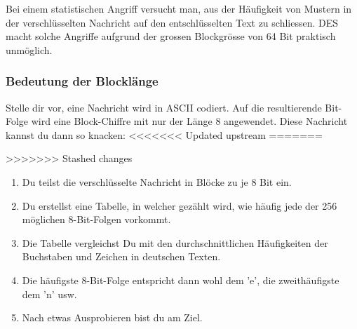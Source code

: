 \documentclass[%
<<<<<<< Updated upstream
11pt,%
twoside,%
titlepage,%
german,%
headsepline%
]{scrartcl}
\begin{document}
\begin{cdef}[Linksverschiebung]{}
\begin{cdef}{}
Bei einem statistischen Angriff versucht man, aus der Häufigkeit von Mustern in der verschlüsselten Nachricht auf den entschlüsselten Text zu schliessen. 
DES macht solche Angriffe aufgrund der grossen Blockgrösse von 64 Bit praktisch unmöglich.

\subsubsection{Bedeutung der Blocklänge}

Stelle dir vor, eine Nachricht wird in ASCII codiert. Auf die resultierende Bit-Folge wird eine Block-Chiffre mit nur der Länge 8 angewendet. 
Diese Nachricht kannst du dann so knacken:
<<<<<<< Updated upstream
=======

>>>>>>> Stashed changes
\begin{enumerate}
\item Du teilst die verschlüsselte Nachricht in Blöcke zu je 8 Bit ein.
\item Du erstellst eine Tabelle, in welcher gezählt wird, wie häufig jede der 256 möglichen 8-Bit-Folgen vorkommt.
\item Die Tabelle vergleichst Du mit den durchschnittlichen Häufigkeiten der Buchstaben und Zeichen in deutschen Texten.
\item Die häufigste 8-Bit-Folge entspricht dann wohl dem 'e', die zweithäufigste dem 'n' usw.
\item Nach etwas Ausprobieren bist du am Ziel.
\end{enumerate}


\end{cdef}
\end{cdef}
\end{document}
